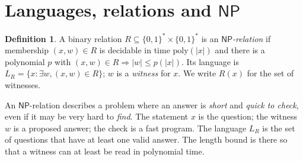 \documentclass[11pt,a4paper]{report}
\theoremstyle{plain}
\theoremstyle{definition}
\newtheorem{definition}[theorem]{Definition}
\theoremstyle{remark}
\newcommand{\poly}{\mathrm{poly}}
\newcommand{\NP}{\mathsf{NP}}\newcommand{\BPP}{\mathsf{BPP}}\newcommand{\IP}{\mathsf{IP}}
\begin{document}
\section{Languages, relations and \texorpdfstring{$\NP$}{NP}}
\begin{definition}
A binary relation $R\subseteq\{0,1\}^*\times\{0,1\}^*$ is an \emph{$\NP$-relation} if membership $(x,w)\in R$ is decidable in time $\poly(|x|)$ and there is a polynomial $p$ with $(x,w)\in R\Rightarrow|w|\le p(|x|)$. Its language is $L_R=\{x:\exists w,(x,w)\in R\}$; $w$ is a \emph{witness} for $x$. We write $R(x)$ for the set of witnesses.
\end{definition}
\begin{plain}\PE
An $\NP$-relation describes a problem where an answer is \emph{short} and \emph{quick to check}, even if it may be very hard to \emph{find}. The statement $x$ is the question; the witness $w$ is a proposed answer; the check is a fast program. The language $L_R$ is the set of questions that have at least one valid answer. The length bound is there so that a witness can at least be read in polynomial time.
\end{plain}
\end{document}
